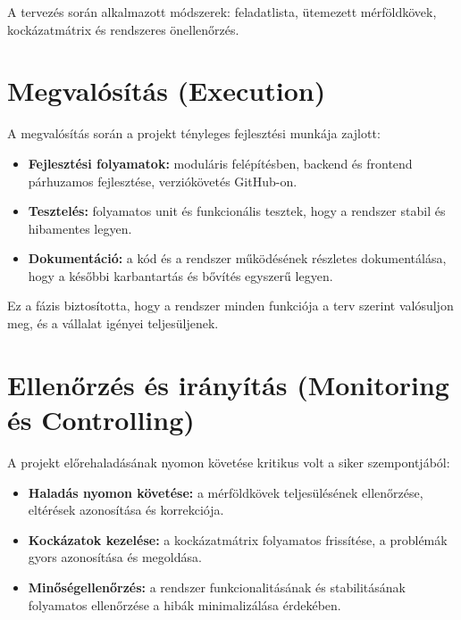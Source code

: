 A tervezés során alkalmazott módszerek: feladatlista, ütemezett mérföldkövek, kockázatmátrix és rendszeres önellenőrzés.

\section{Megvalósítás (Execution)}

A megvalósítás során a projekt tényleges fejlesztési munkája zajlott:
\begin{itemize}
    \item \textbf{Fejlesztési folyamatok:} moduláris felépítésben, backend és frontend párhuzamos fejlesztése, verziókövetés GitHub-on.
    \item \textbf{Tesztelés:} folyamatos unit és funkcionális tesztek, hogy a rendszer stabil és hibamentes legyen.
    \item \textbf{Dokumentáció:} a kód és a rendszer működésének részletes dokumentálása, hogy a későbbi karbantartás és bővítés egyszerű legyen.
\end{itemize}

Ez a fázis biztosította, hogy a rendszer minden funkciója a terv szerint valósuljon meg, és a vállalat igényei teljesüljenek.

\section{Ellenőrzés és irányítás (Monitoring és Controlling)}

A projekt előrehaladásának nyomon követése kritikus volt a siker szempontjából:
\begin{itemize}
    \item \textbf{Haladás nyomon követése:} a mérföldkövek teljesülésének ellenőrzése, eltérések azonosítása és korrekciója.
    \item \textbf{Kockázatok kezelése:} a kockázatmátrix folyamatos frissítése, a problémák gyors azonosítása és megoldása.
    \item \textbf{Minőségellenőrzés:} a rendszer funkcionalitásának és stabilitásának folyamatos ellenőrzése a hibák minimalizálása érdekében.
\end{itemize}

